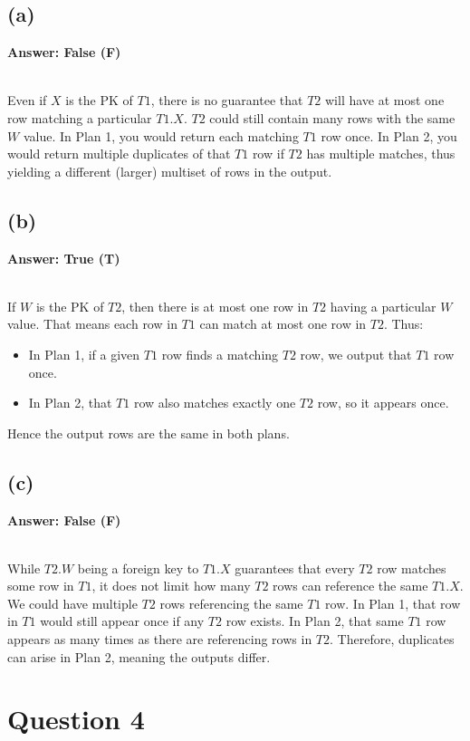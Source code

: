 \documentclass{article}
\begin{document}
\subsection*{(a)}
\textbf{Answer: False (F)}

\leavevmode\\
Even if $X$ is the PK of $T1$, there is no guarantee that $T2$ will have at most one row matching a particular $T1.X$. $T2$ could still contain many rows with the same $W$ value. In Plan 1, you would return each matching $T1$ row once. In Plan 2, you would return multiple duplicates of that $T1$ row if $T2$ has multiple matches, thus yielding a different (larger) multiset of rows in the output.

\newpage
\subsection*{(b)}
\textbf{Answer: True (T)}

\leavevmode\\
If $W$ is the PK of $T2$, then there is at most one row in $T2$ having a particular $W$ value. That means each row in $T1$ can match  at most one  row in $T2$. Thus:

\begin{itemize}
  \item In Plan 1, if a given $T1$ row finds a matching $T2$ row, we output that $T1$ row once.
  \item In Plan 2, that $T1$ row also matches exactly one $T2$ row, so it appears once.
\end{itemize}

Hence the output rows are the same in both plans.

\subsection*{(c)}
\textbf{Answer: False (F)}

\leavevmode\\
While $T2.W$ being a foreign key to $T1.X$ guarantees that every $T2$ row matches  some  row in $T1$, it  does not  limit how many $T2$ rows can reference the  same  $T1.X$. We could have multiple $T2$ rows referencing the same $T1$ row. In Plan 1, that row in $T1$ would still appear  once  if any $T2$ row exists. In Plan 2, that same $T1$ row appears  as many times  as there are referencing rows in $T2$. Therefore, duplicates can arise in Plan 2, meaning the outputs differ.

\newpage
\section*{Question 4}
\end{document}
